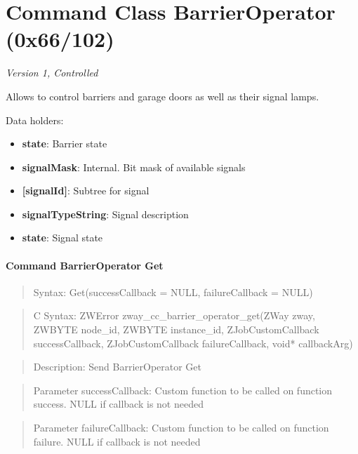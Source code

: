 \section{Command Class BarrierOperator (0x66/102)}

\textit{Version 1, Controlled}
\newline

Allows to control barriers and garage doors as well as their signal lamps.
\newline

\noindent
Data holders:

\begin{itemize}
\item \textbf{state}: Barrier state
\item \textbf{signalMask}: Internal. Bit mask of available signals
\item \textbf{[signalId]}: Subtree for signal
\item \qquad\textbf{signalTypeString}: Signal description
\item \qquad\textbf{state}: Signal state
\end{itemize}

\paragraph{Command BarrierOperator Get}
\begin{quote}Syntax: Get(successCallback = NULL, failureCallback = NULL)\end{quote}
\begin{quote}C Syntax: ZWError zway\_cc\_barrier\_operator\_get(ZWay zway, ZWBYTE node\_id, ZWBYTE instance\_id, ZJobCustomCallback successCallback, ZJobCustomCallback failureCallback, void* callbackArg)\end{quote}
\begin{quote}Description: Send BarrierOperator Get\end{quote}
\begin{quote}Parameter successCallback: Custom function to be called on function success. NULL if callback is not needed\end{quote}
\begin{quote}Parameter failureCallback: Custom function to be called on function failure. NULL if callback is not needed\end{quote}


